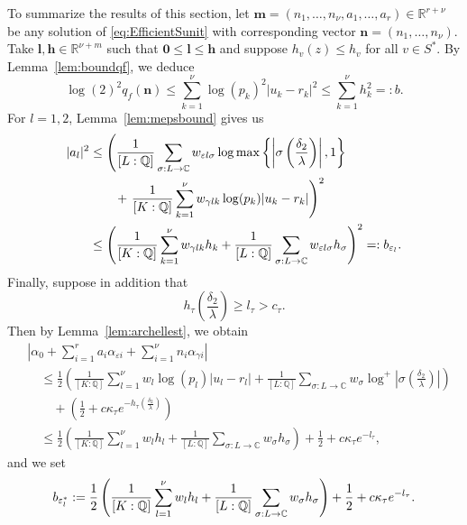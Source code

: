 To summarize the results of this section, let $\mathbf{m} = (n_1, \dots, n_{\nu}, a_1, \dots, a_r) \in \mathbb{R}^{r + \nu}$ be any solution of \eqref{eq:EfficientSunit} with corresponding vector $\mathbf{n} = (n_1, \dots, n_{\nu})$. Take $\mathbf{l},\mathbf{h}\in\mathbb{R}^{\nu+m}$ such that $\mathbf{0} \leq \mathbf{l} \leq \mathbf{h}$ and suppose $h_v(z)\leq h_v$ for all $v\in S^*$. By Lemma~\ref{lem:boundqf}, we deduce
\begin{equation} \label{def:bbound}
\log(2)^2q_f(\mathbf{n}) \leq \sum_{k = 1}^{\nu} \log(p_k)^2|u_k -r_k|^2 \leq \sum_{k = 1}^{\nu} h_k^2=:b.
\end{equation}
For $l = 1, 2$, Lemma~\ref{lem:mepsbound} gives us
\begin{align}\label{def:bepsbound}
|a_l|^2 &\leq \left(\frac{1}{[L:\mathbb{Q}]}\sum_{\sigma :L \to \mathbb{C}} w_{\varepsilon l \sigma}\log \max \left\{ \left|\sigma\left(\frac{\delta_2}{\lambda}\right)\right|, 1\right\} \right.\\
	& \quad \quad+ \left. \frac{1}{[K:\mathbb{Q}]}\sum_{k = 1}^{\nu} w_{\gamma l k}\log(p_k)|u_k - r_k|\right)^2\\
	&\leq \left( \frac{1}{[K:\mathbb{Q}]}\sum_{k = 1}^{\nu} w_{\gamma l k}h_k + \frac{1}{[L:\mathbb{Q}]}\sum_{\sigma:L\to \mathbb{C}} w_{\varepsilon l \sigma}h_{\sigma}\right)^2 =: b_{\varepsilon_l}.
\end{align}
Finally, suppose in addition that
\[h_{\tau}\left(\frac{\delta_2}{\lambda}\right) \geq l_{\tau} > c_{\tau}.\]
Then by Lemma~\ref{lem:archellest}, we obtain
\begin{align*}
& \left|\alpha_0+\sum_{i = 1}^r a_i \alpha_{\varepsilon i} + \sum_{i = 1}^{\nu} n_i \alpha_{\gamma i}\right| \\
	& \quad \leq \frac{1}{2}\left(\frac{1}{[K:\mathbb{Q}]}\sum_{l = 1}^{\nu}w_l \log(p_l)|u_l - r_l| + \frac{1}{[L:\mathbb{Q}]}\sum_{\sigma :L \to \mathbb{C}} w_{\sigma}\log^+ \left|\sigma\left(\frac{\delta_2}{\lambda}\right)\right| \right)\\
	&\quad\quad + \left(\frac{1}{2} + c\kappa_{\tau}e^{-h_{\tau}\left(\frac{\delta_2}{\lambda}\right)}\right)\\
	& \quad \leq \frac{1}{2}\left(\frac{1}{[K:\mathbb{Q}]}\sum_{l = 1}^{\nu}w_l h_l + \frac{1}{[L:\mathbb{Q}]}\sum_{\sigma :L \to \mathbb{C}} w_{\sigma}h_{\sigma} \right) + \frac{1}{2} + c\kappa_{\tau}e^{-l_{\tau}}, 
\end{align*} 
and we set
\begin{equation} \label{def:bepstarbound}
b_{\varepsilon_l^*}:= \frac{1}{2}\left(\frac{1}{[K:\mathbb{Q}]}\sum_{l = 1}^{\nu}w_l h_l + \frac{1}{[L:\mathbb{Q}]}\sum_{\sigma :L \to \mathbb{C}} w_{\sigma}h_{\sigma} \right) + \frac{1}{2} + c\kappa_{\tau}e^{-l_{\tau}}.
\end{equation}

